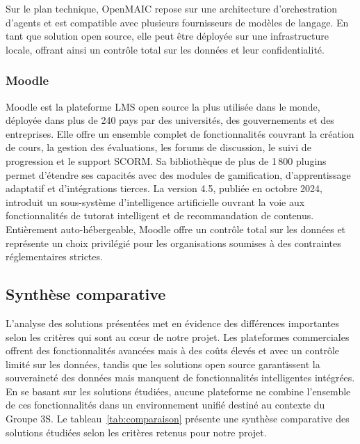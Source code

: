 Sur le plan technique, OpenMAIC repose sur une architecture d’orchestration d’agents et est compatible avec plusieurs fournisseurs de modèles de langage. En tant que solution open source, elle peut être déployée sur une infrastructure locale, offrant ainsi un contrôle total sur les données et leur confidentialité.
\subsubsection{Moodle}

Moodle \cite{moodle} est la plateforme LMS open source la plus utilisée dans le monde, 
déployée dans plus de 240 pays par des universités, des gouvernements et des entreprises. 
Elle offre un ensemble complet de fonctionnalités couvrant la création de cours, la gestion 
des évaluations, les forums de discussion, le suivi de progression et le support SCORM. 
Sa bibliothèque de plus de 1\,800 plugins permet d'étendre ses capacités avec des modules 
de gamification, d'apprentissage adaptatif et d'intégrations tierces. La version 4.5, 
publiée en octobre 2024, introduit un sous-système d'intelligence artificielle ouvrant 
la voie aux fonctionnalités de tutorat intelligent et de recommandation de contenus. 
Entièrement auto-hébergeable, Moodle offre un contrôle total sur les données et représente 
un choix privilégié pour les organisations soumises à des contraintes réglementaires strictes.





\subsection{Synthèse comparative}

L'analyse des solutions présentées met en évidence des différences importantes selon les 
critères qui sont au cœur de notre projet. Les plateformes commerciales offrent des 
fonctionnalités avancées mais à des coûts élevés et avec un contrôle limité sur les données, 
tandis que les solutions open source garantissent la souveraineté des données mais manquent 
de fonctionnalités intelligentes intégrées. En se basant sur les solutions étudiées, aucune 
plateforme ne combine l'ensemble de ces fonctionnalités dans un environnement unifié destiné 
au contexte du Groupe 3S. Le tableau~\ref{tab:comparaison} présente une synthèse comparative 
des solutions étudiées selon les critères retenus pour notre projet.

